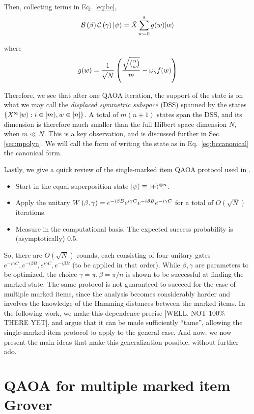 \documentclass[11pt]{article}
\begin{document}
\begin{enumerate}
Then, collecting terms in Eq.~\ref{eq:bc},
\begin{equation}
  \label{eq:bccanonical}
  \mathcal{B}\left(\beta\right)\mathcal{C}\left(\gamma\right)|\psi\rangle = \bar{X}\sum\limits_{w=0}^{n}g(w)|w\rangle
\end{equation}

where $$g(w) = \frac{1}{\sqrt{N}}\left(\frac{\sqrt{\binom n w}}{m} - \omega_\gamma f(w)\right)$$

Therefore, we see that after one QAOA iteration, the support of the state is on what we may call the \emph{displaced symmetric subspace} (DSS) spanned by the states $\left\{X^{\mathbf{x_i}}|w\rangle: i\in [m), w\in [n]\right\}$. A total of $m(n+1)$ states span the DSS, and its dimension is therefore much smaller than the full Hilbert space dimension $N$, when $m\ll N$. This is a key observation, and is discussed further in Sec. \ref{sec:mpolyn}. We will call the form of writing the state as in Eq.~\ref{eq:bccanonical} the canonical form.
\end{enumerate}
Lastly, we give a quick review of the single-marked item QAOA protocol used in \cite{Jiang2017}.
\begin{itemize}
\item Start in the equal superposition state $|\psi\rangle\equiv|+\rangle^{\otimes n}$.
\item Apply the unitary $W\left(\beta,\gamma\right)=e^{-i\beta B}e^{i\gamma C}e^{-i\beta B}e^{-i\gamma C}$ for a total of $O(\sqrt{N})$ iterations.
\item Measure in the computational basis. The expected success probability is (asymptotically) $0.5$.
\end{itemize}
So, there are $O(\sqrt{N})$ rounds, each consisting of four unitary gates $e^{-i\gamma C},e^{-i\beta B}, e^{i\gamma C}, e^{-i\beta B}$ (to be applied in that order). While $\beta,\gamma$ are parameters to be optimized, the choice $\gamma=\pi, \beta=\pi/n$ is shown to be successful at finding the marked state. The same protocol is not guaranteed to succeed for the case of multiple marked items, since the analysis becomes considerably harder and involves the knowledge of the Hamming distances between the marked items. In the following work, we make this dependence precise [WELL, NOT 100\% THERE YET], and argue that it can be made sufficiently ``tame'', allowing the single-marked item protocol to apply to the general case. And now, we now present the main ideas that make this generalization possible, without further ado. 

\section{QAOA for multiple marked item Grover}
\end{document}
